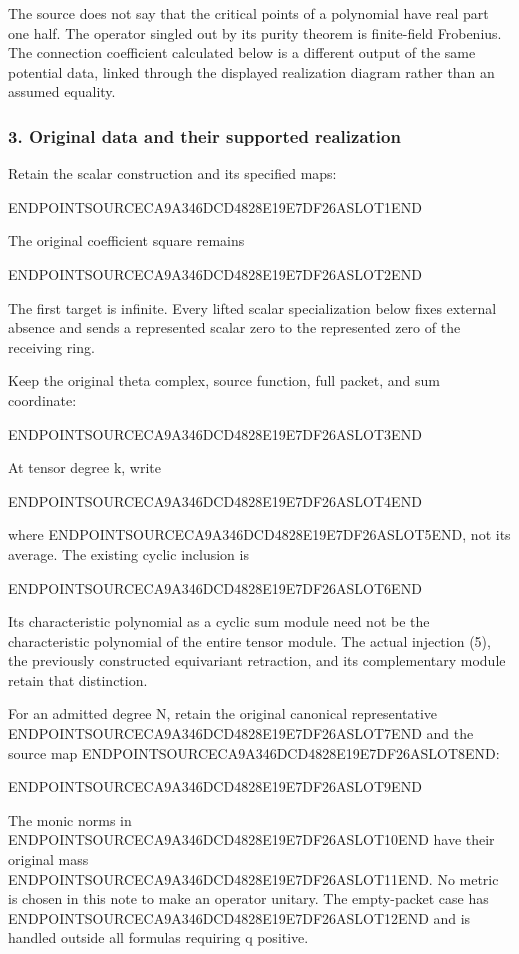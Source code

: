 The source does not say that the critical points of a polynomial have real part one half. The operator singled out by its purity theorem is finite-field Frobenius. The connection coefficient calculated below is a different output of the same potential data, linked through the displayed realization diagram rather than an assumed equality.

\subsubsection{3. Original data and their supported realization}\label{endpoint-exponential_original--original-data-and-their-supported-realization}

Retain the scalar construction and its specified maps:

ENDPOINTSOURCECA9A346DCD4828E19E7DF26ASLOT1END

The original coefficient square remains

ENDPOINTSOURCECA9A346DCD4828E19E7DF26ASLOT2END

The first target is infinite. Every lifted scalar specialization below fixes external absence and sends a represented scalar zero to the represented zero of the receiving ring.

Keep the original theta complex, source function, full packet, and sum coordinate:

ENDPOINTSOURCECA9A346DCD4828E19E7DF26ASLOT3END

At tensor degree k, write

ENDPOINTSOURCECA9A346DCD4828E19E7DF26ASLOT4END

where ENDPOINTSOURCECA9A346DCD4828E19E7DF26ASLOT5END, not its average. The existing cyclic inclusion is

ENDPOINTSOURCECA9A346DCD4828E19E7DF26ASLOT6END

Its characteristic polynomial as a cyclic sum module need not be the characteristic polynomial of the entire tensor module. The actual injection (5), the previously constructed equivariant retraction, and its complementary module retain that distinction.

For an admitted degree N, retain the original canonical representative ENDPOINTSOURCECA9A346DCD4828E19E7DF26ASLOT7END and the source map ENDPOINTSOURCECA9A346DCD4828E19E7DF26ASLOT8END:

ENDPOINTSOURCECA9A346DCD4828E19E7DF26ASLOT9END

The monic norms in ENDPOINTSOURCECA9A346DCD4828E19E7DF26ASLOT10END have their original mass ENDPOINTSOURCECA9A346DCD4828E19E7DF26ASLOT11END. No metric is chosen in this note to make an operator unitary. The empty-packet case has ENDPOINTSOURCECA9A346DCD4828E19E7DF26ASLOT12END and is handled outside all formulas requiring q positive.

